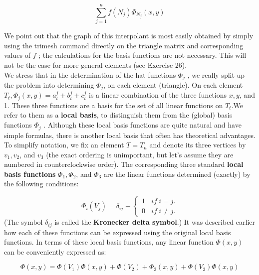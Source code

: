\documentclass[../main.tex]{subfiles}
\begin{document}
$$ \sum_{j=1}^{n} f(N_j) \Phi_{N_j}(x,y)$$

We point out that the graph of this interpolant is most easily obtained by simply using the trimesh command directly on the triangle matrix and corresponding values of $f$ ; the calculations for the basis functions are not necessary. This will not be the case for more general elements (see Exercise 26). 
\\

We stress that in the determination of the hat functions $\Phi_j$ , we really split up the problem into determining $\Phi_j$, on each element (triangle). On each element $T_t, \Phi_j(x,y)=a_t^j+b_t^j+c_t^j$ is a linear combination of the three functions $x,y$, and 1. These three functions are a basis for the set of all linear functions on $T_t$.We refer to them as a \textbf{local basis}, to distinguish them from the (global) basis functions $\Phi_j$ . Although these local basis functions are quite natural and have simple formulas, there is another local basis that often has theoretical advantages. To simplify notation, we fix an element $T = T_n$ and denote its three vertices by 
$v_1,v_2$, and $v_3$ (the exact ordering is unimportant, but let's assume they are numbered in counterclockwise order). The corresponding three standard \textbf{local basis functions} $\Phi _1,\Phi_2$, and $\Phi_3$ are the linear functions determined (exactly) by the following conditions: 

\begin{equation}
	\Phi_i(V_j)=\delta_{ij}\equiv 
			\begin{cases}
				1~~~~if~i=j.\\
				0~~~~if~i\neq j.
			\end{cases}
\end{equation}
(The symbol $\delta_{ij}$ is called the \textbf{Kronecker delta symbol}.) It was described earlier how each of these functions can be expressed using the original local basis functions. In terms of these local basis functions, any linear function $\Phi(x,y)$ can be conveniently expressed as:

\begin{equation}
\Phi(x,y)=\Phi(V_1)\Phi(x,y)+\Phi(V_2)+\Phi_2(x,y)+\Phi(V_3)\Phi(x,y)
\end{equation}
\end{document}

